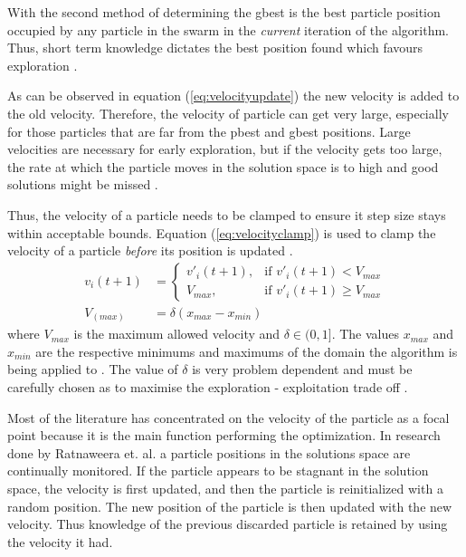 With the second method of determining the gbest is the best particle position occupied by any particle in the swarm in the \emph{current} iteration of the algorithm. Thus, short term knowledge dictates the best position found which favours exploration \cite{CompuIntelligenceIntro,FundamentalSwarm}.

As can be observed in equation (\ref{eq:velocityupdate}) the new velocity is added to the old velocity. Therefore, the velocity of particle can get very large, especially for those particles that are far from the pbest and gbest positions. Large velocities are necessary for early exploration, but if the velocity gets too large, the rate at which the particle moves in the solution space is to high and good solutions might be missed \cite{FundamentalSwarm}.

Thus, the velocity of a particle needs to be clamped to ensure it step size stays within acceptable bounds. Equation (\ref{eq:velocityclamp}) is used to clamp the velocity of a particle \emph{before} its position is updated \cite{FundamentalSwarm}.
\begin{align}
	v_i(t+1) &=
	\begin{cases}
	v'_i(t+1), &\text{if $v'_i(t+1) < V_{max}$}\\
	V_{max}, &\text{if $v'_i(t+1) \geq V_{max}$}
	\end{cases} \label{eq:velocityclamp}\\
	V_(max) &= \delta(x_{max} - x_{min})
\end{align}
where $V_{max}$ is the maximum allowed velocity and $\delta \in (0,1]$. The values $x_{max}$ and $x_{min}$ are the respective minimums and maximums of the domain the algorithm is being applied to \cite{FundamentalSwarm}. The value of $\delta$ is very problem dependent and must be carefully chosen as to maximise the exploration - exploitation trade off \cite{FundamentalSwarm}. 

Most of the literature has concentrated on the velocity of the particle as a focal point because it is the main function performing the optimization. In research done by Ratnaweera et. al.\cite{PSOSelfHierarch} a particle positions in the solutions space are continually monitored. If the particle appears to be stagnant in the solution space, the velocity is first updated, and then the particle is reinitialized with a random position. The new position of the particle is then updated with the new velocity. Thus knowledge of the previous discarded particle is retained by using the velocity it had\cite{PSOSelfHierarch}.

